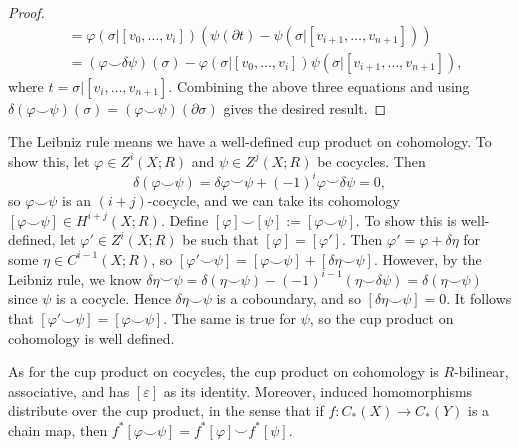\documentclass{book}
\renewcommand{\epsilon}{\varepsilon}
\renewcommand{\phi}{\varphi}
\theoremstyle{definition}
\theoremstyle{remark}
\numberwithin{equation}{section}
\begin{document}
\begin{proof}
\begin{equation}
\begin{aligned}
                              &= \phi(\sigma \vert [v_0,\dots,v_i]) (\psi(\partial t) - \psi(\sigma \vert [v_{i+1},\dots,v_{n+1}])) \\
                              &= (\phi \smile \delta\psi)(\sigma) - \phi(\sigma \vert [v_0,\dots,v_i]) \psi(\sigma \vert [v_{i+1},\dots,v_{n+1}]),
    \end{aligned} \end{equation}
    where $t = \sigma \vert [v_i,\dots,v_{n+1}]$. Combining the above three equations and using $\delta(\phi \smile \psi)(\sigma) = (\phi \smile \psi)(\partial\sigma)$ gives the desired result.
\end{proof}

The Leibniz rule means we have a well-defined cup product on cohomology. To show this, let $\phi \in Z^i(X;R)$ and $\psi \in Z^j(X;R)$ be cocycles. Then
\begin{equation}
    \delta(\phi \smile \psi) = \delta\phi \smile \psi + (-1)^i \phi \smile \delta\psi = 0,
\end{equation}
so $\phi \smile \psi$ is an $(i+j)$-cocycle, and we can take its cohomology $[\phi \smile \psi] \in H^{i+j}(X;R)$. Define $[\phi] \smile [\psi] := [\phi \smile \psi]$. To show this is well-defined, let $\phi' \in Z^i(X;R)$ be such that $[\phi] = [\phi']$. Then $\phi' = \phi + \delta\eta$ for some $\eta \in C^{i-1}(X;R)$, so $[\phi' \smile \psi] = [\phi \smile \psi] + [\delta\eta \smile \psi]$. However, by the Leibniz rule, we know $\delta\eta \smile \psi = \delta(\eta \smile \psi) - (-1)^{i-1}(\eta \smile \delta\psi) = \delta(\eta \smile \psi)$ since $\psi$ is a cocycle. Hence $\delta\eta \smile \psi$ is a coboundary, and so $[\delta\eta \smile \psi] = 0$. It follows that $[\phi' \smile \psi] = [\phi \smile \psi]$. The same is true for $\psi$, so the cup product on cohomology is well defined.

As for the cup product on cocycles, the cup product on cohomology is $R$-bilinear, associative, and has $[\epsilon]$ as its identity. Moreover, induced homomorphisms distribute over the cup product, in the sense that if $f \colon C_*(X) \to C_*(Y)$ is a chain map, then $f^*[\phi \smile \psi] = f^*[\phi] \smile f^*[\psi]$.
\end{document}
